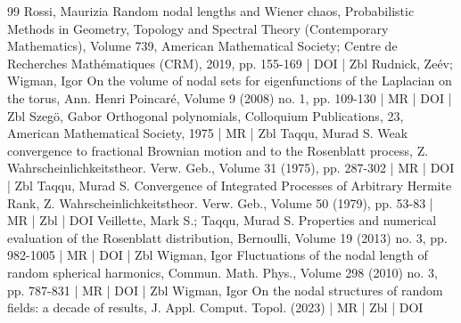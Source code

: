 \begin{thebibliography}{99}
 Rossi, Maurizia Random nodal lengths and Wiener chaos, Probabilistic Methods in Geometry, Topology and Spectral Theory (Contemporary Mathematics), Volume 739, American Mathematical Society; Centre de Recherches Mathématiques (CRM), 2019, pp. 155-169 | DOI | Zbl
 Rudnick, Zeév; Wigman, Igor On the volume of nodal sets for eigenfunctions of the Laplacian on the torus, Ann. Henri Poincaré, Volume 9 (2008) no. 1, pp. 109-130 | MR | DOI | Zbl
 Szegö, Gabor Orthogonal polynomials, Colloquium Publications, 23, American Mathematical Society, 1975 | MR | Zbl
 Taqqu, Murad S. Weak convergence to fractional Brownian motion and to the Rosenblatt process, Z. Wahrscheinlichkeitstheor. Verw. Geb., Volume 31 (1975), pp. 287-302 | MR | DOI | Zbl
 Taqqu, Murad S. Convergence of Integrated Processes of Arbitrary Hermite Rank, Z. Wahrscheinlichkeitstheor. Verw. Geb., Volume 50 (1979), pp. 53-83 | MR | Zbl | DOI
 Veillette, Mark S.; Taqqu, Murad S. Properties and numerical evaluation of the Rosenblatt distribution, Bernoulli, Volume 19 (2013) no. 3, pp. 982-1005 | MR | DOI | Zbl
 Wigman, Igor Fluctuations of the nodal length of random spherical harmonics, Commun. Math. Phys., Volume 298 (2010) no. 3, pp. 787-831 | MR | DOI | Zbl
 Wigman, Igor On the nodal structures of random fields: a decade of results, J. Appl. Comput. Topol. (2023) | MR | Zbl | DOI
\end{thebibliography}
